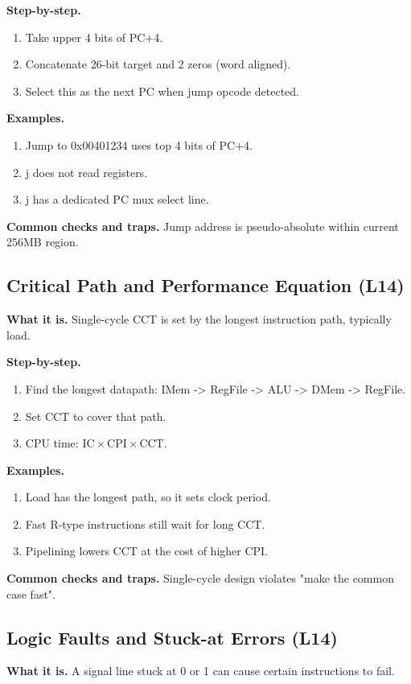 \documentclass[11pt]{article}
\begin{document}
\textbf{Step-by-step.}
\begin{enumerate}[leftmargin=*]
  \item Take upper 4 bits of PC+4.
  \item Concatenate 26-bit target and 2 zeros (word aligned).
  \item Select this as the next PC when jump opcode detected.
\end{enumerate}

\textbf{Examples.}
\begin{enumerate}[leftmargin=*]
  \item Jump to 0x00401234 uses top 4 bits of PC+4.
  \item j does not read registers.
  \item j has a dedicated PC mux select line.
\end{enumerate}

\textbf{Common checks and traps.} Jump address is pseudo-absolute within current 256MB region.

\subsection{Critical Path and Performance Equation (L14)}
\textbf{What it is.} Single-cycle CCT is set by the longest instruction path, typically load.

\textbf{Step-by-step.}
\begin{enumerate}[leftmargin=*]
  \item Find the longest datapath: IMem -> RegFile -> ALU -> DMem -> RegFile.
  \item Set CCT to cover that path.
  \item CPU time: $\text{IC} \times \text{CPI} \times \text{CCT}$.
\end{enumerate}

\textbf{Examples.}
\begin{enumerate}[leftmargin=*]
  \item Load has the longest path, so it sets clock period.
  \item Fast R-type instructions still wait for long CCT.
  \item Pipelining lowers CCT at the cost of higher CPI.
\end{enumerate}

\textbf{Common checks and traps.} Single-cycle design violates "make the common case fast".

\subsection{Logic Faults and Stuck-at Errors (L14)}
\textbf{What it is.} A signal line stuck at 0 or 1 can cause certain instructions to fail.
\end{document}
